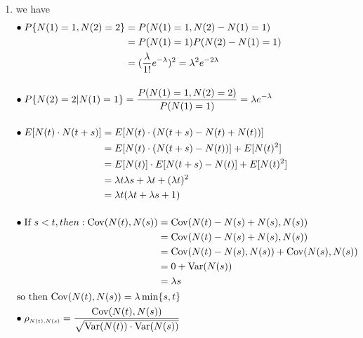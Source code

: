 {\begin{enumerate}
    \item we have
        \begin{align*}
            &\begin{aligned}
                \bullet\; P\{N(1)=1,N(2)=2\} &= P(N(1) = 1,N(2)-N(1) = 1)\\
                &=P(N(1) = 1)P(N(2)-N(1) = 1) \\
                &= (\frac{\lambda}{1!} e^{-\lambda })^2 = \lambda ^2 e^{-2\lambda}  
            \end{aligned}\\[1.2em]
            &\begin{aligned}
                \bullet\;P\{N(2) = 2|N(1) = 1\} = \frac{P(N(1) =1 ,N(2) =2)}{P(N(1) = 1)} = \lambda e^{-\lambda}
            \end{aligned}\\[1.2em]
            &\begin{aligned}
                \bullet\;E[N(t)\cdot N(t+s)] &= E[N(t)\cdot (N(t+s)-N(t)+N(t))]\\
                &=E[N(t)\cdot (N(t+s)-N(t))] + E[N(t)^2]\\
                &=E[N(t)]\cdot E[N(t+s)-N(t)] + E[N(t)^2]\\
                &=\lambda t\lambda s + \lambda t+(\lambda t)^2\\
                &=\lambda t(\lambda t + \lambda s + 1)
            \end{aligned}\\[1.2em]
            &\begin{aligned} 
                \bullet\;\mbox{If } s<t,then:\mathrm{Cov}(N(t),N(s)) &= \mathrm{Cov}(N(t)-N(s)+N(s),N(s))\\
                &=\mathrm{Cov}(N(t)-N(s)+N(s),N(s))\\
                &=\mathrm{Cov}(N(t)-N(s),N(s))+\mathrm{Cov}(N(s),N(s))\\
                &=0 + \mathrm{Var}(N(s))\\
                &= \lambda s
            \end{aligned}\\
            &\mbox{so then } \mathrm{Cov}(N(t),N(s)) = \lambda \min\{s,t \}\\
            &\begin{aligned}
                \bullet{}\;\rho_{\scriptscriptstyle N(t), N(s)} 
                    = \frac{{\rm Cov}(N(t), N(s))}{\sqrt{{\rm Var}(N(t))\cdot {\rm Var}(N(s))}}

\end{aligned}
\end{align*}
\end{enumerate}}
